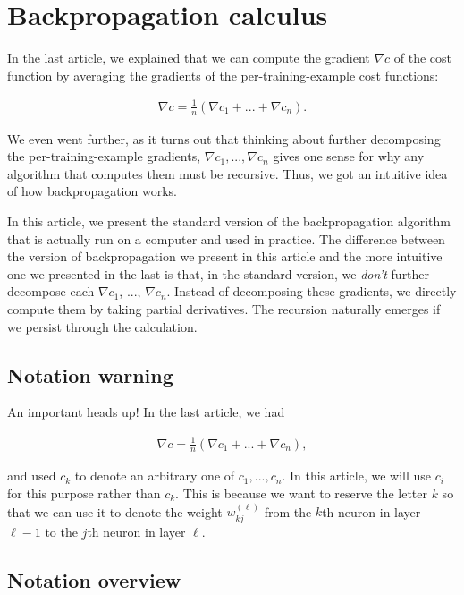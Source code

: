 \documentclass{article}
\begin{document}
	\section*{Backpropagation calculus}
	
	In the last article, we explained that  we can compute the gradient $\nabla c$ of the cost function by averaging the gradients of the per-training-example cost functions: 

	\begin{align*}
		\nabla c = \frac{1}{n}\left(\nabla c_1 + ... + \nabla c_n\right).
	\end{align*}

	We even went further, as it turns out that thinking about further decomposing the per-training-example gradients, $\nabla c_1, ..., \nabla c_n$ gives one sense for why any algorithm that computes them must be recursive. Thus, we got an intuitive idea of how backpropagation works.

	In this article, we present the standard version of the backpropagation algorithm that is actually run on a computer and used in practice. The difference between the version of backpropagation we present in this article and the more intuitive one we presented in the last is that, in the standard version, we \textit{don't} further decompose each $\nabla c_1$, ..., $\nabla c_n$. Instead of decomposing these gradients, we directly compute them by taking partial derivatives. The recursion naturally emerges if we persist through the calculation.
	
	\subsection*{Notation warning}
	
	An important heads up! In the last article, we had 

	\begin{align*}
		\nabla c = \frac{1}{n}\left(\nabla c_1 + ... + \nabla c_n\right),
	\end{align*}

	and used $c_k$ to denote an arbitrary one of $c_1, ..., c_n$. In this article, we will use $c_i$ for this purpose rather than $c_k$. This is because we want to reserve the letter $k$ so that we can use it to denote the weight $w^{(\ell)}_{kj}$ from the $k$th neuron in layer $\ell - 1$ to the $j$th neuron in layer $\ell$.
	
	\subsection*{Notation overview}
	
\end{document}
